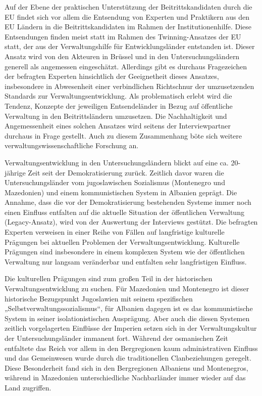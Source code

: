 Auf der Ebene der praktischen Unterstützung der Beitrittskandidaten durch die EU findet sich vor allem die Entsendung von Experten und Praktikern aus den EU Ländern in die Beitrittskandidaten im Rahmen der Institutionenhilfe. Diese Entsendungen finden meist statt im Rahmen des Twinning-Ansatzes der EU statt, der aus der Verwaltungshilfe für Entwicklungsländer entstanden ist. Dieser Ansatz wird von den Akteuren in Brüssel und in den Untersuchungsländern generell als angemessen eingeschätzt. Allerdings gibt es durchaus Fragezeichen der befragten Experten hinsichtlich der Geeignetheit dieses Ansatzes, insbesondere in Abwesenheit einer verbindlichen Richtschnur der umzusetzenden Standards zur Verwaltungsentwicklung. Als problematisch erlebt wird die Tendenz, Konzepte der jeweiligen Entsendeländer in Bezug auf öffentliche Verwaltung in den Beitrittsländern umzusetzen. Die Nachhaltigkeit und Angemessenheit eines solchen Ansatzes wird seitens der Interviewpartner durchaus in Frage gestellt. Auch zu diesem Zusammenhang böte sich weitere verwaltungswissenschaftliche Forschung an. \par
Verwaltungsentwicklung in den Untersuchungsländern blickt auf eine ca. 20-jährige Zeit seit der Demokratisierung zurück. Zeitlich davor waren die Untersuchungsländer vom jugoslawischen Sozialismus (Montenegro und Mazedonien) und einem kommunistischen System in Albanien geprägt. Die Annahme, dass die vor der Demokratisierung bestehenden Systeme immer noch einen Einfluss entfalten auf die aktuelle Situation der öffentlichen Verwaltung (Legacy-Ansatz), wird von der Auswertung der Interviews gestützt. Die befragten Experten verweisen in einer Reihe von Fällen auf langfristige kulturelle Prägungen bei aktuellen Problemen der Verwaltungsentwicklung. Kulturelle Prägungen sind insbesondere in einem komplexen System wie der öffentlichen Verwaltung nur langsam veränderbar und entfalten sehr langfristigen Einfluss.\par
Die kulturellen Prägungen sind zum großen Teil in der historischen Verwaltungsentwicklung zu suchen. Für Mazedonien und Montenegro ist dieser historische Bezugspunkt Jugoslawien mit seinem spezifischen „Selbstverwaltungssozialismus“, für Albanien dagegen ist es das kommunistische System in seiner isolationistischen Ausprägung. Aber auch die diesen Systemen zeitlich vorgelagerten Einflüsse der Imperien setzen sich in der Verwaltungskultur der Untersuchungsländer immanent fort. Während der osmanischen Zeit entfaltete das Reich vor allem in den Bergregionen kaum administrativen Einfluss und das Gemeinwesen wurde durch die traditionellen Clanbeziehungen geregelt. Diese Besonderheit fand sich in den Bergregionen Albaniens und Montenegros, während in Mazedonien unterschiedliche Nachbarländer immer wieder auf das Land zugriffen.\par
